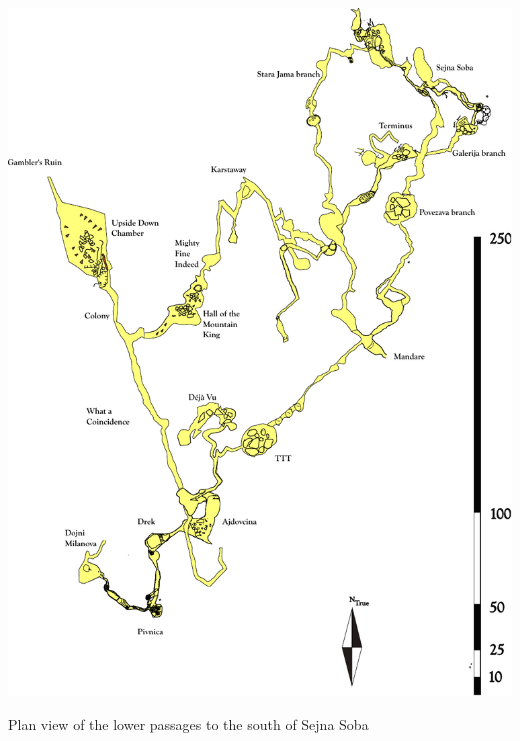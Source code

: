 \begin{pagesurvey}
\centering
\includegraphics[width=\textwidth]{images/pdf_maps/primalow.pdf}
\caption{Plan view of the lower passages to the south of Sejna Soba}
\label{prima low trip}
\end{pagesurvey}
